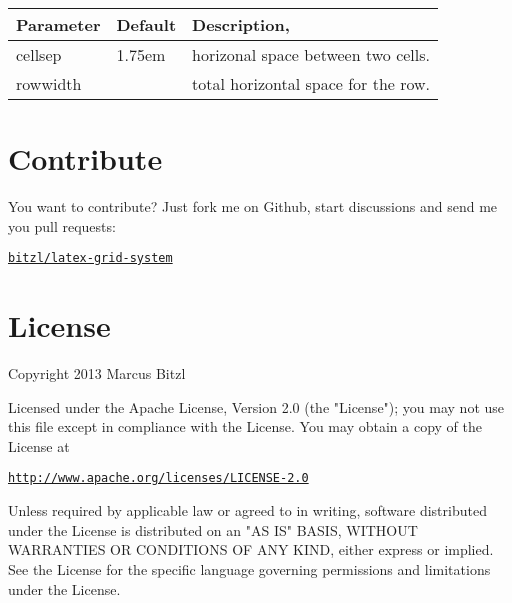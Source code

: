 \documentclass[DIV13]{scrartcl}
\begin{document}
\medskip

\begin{tabularx}{\linewidth}{llX}\toprule
\textbf{Parameter} & \textbf{Default} & \textbf{Description},\\ \midrule
cellsep & 1.75em & horizonal space between two cells.\\\bottomrule
rowwidth & \linewidth & total horizontal space for the row.\\\bottomrule
\end{tabularx}

\section{Contribute}
You want to contribute? Just fork me on Github, start discussions and send me you pull requests: 
\begin{center}
	\href{https://github.com/bitzl/latex-grid-system}{\tt bitzl/latex-grid-system}
\end{center}
	


\section{License}
Copyright 2013 Marcus Bitzl

\medskip

Licensed under the Apache License, Version 2.0 (the "License");
you may not use this file except in compliance with the License.
You may obtain a copy of the License at

\medskip

\hspace*{1.2em}\href{http://www.apache.org/licenses/LICENSE-2.0}{\texttt{http://www.apache.org/licenses/LICENSE-2.0}}

\medskip

Unless required by applicable law or agreed to in writing, software
distributed under the License is distributed on an "AS IS" BASIS,
WITHOUT WARRANTIES OR CONDITIONS OF ANY KIND, either express or implied.
See the License for the specific language governing permissions and
limitations under the License.
\end{document}
